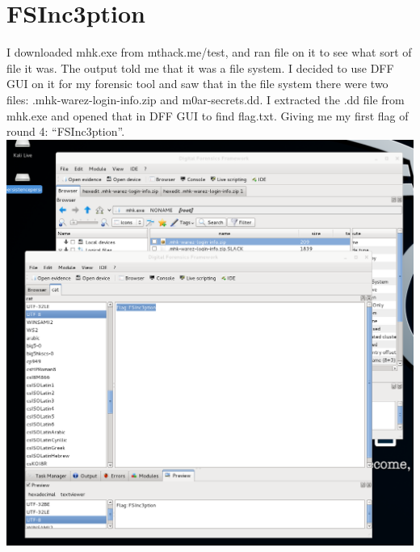 \documentclass[12pt]{report}
\begin{document}
\section{FSInc3ption}
I downloaded mhk.exe from mthack.me/test, and ran file on it to see what sort of file it was. The output told me that it was a file system. I decided to use DFF GUI on it for my forensic tool and saw that in the file system there were two files: .mhk-warez-login-info.zip and m0ar-secrets.dd. I extracted the .dd file from mhk.exe and opened that in DFF GUI to find flag.txt. Giving me my first flag of round 4: ``FSInc3ption''.\\
\includegraphics[scale=0.33, width=\linewidth]{FSInc3ption.PNG}
\newline
\end{document}
